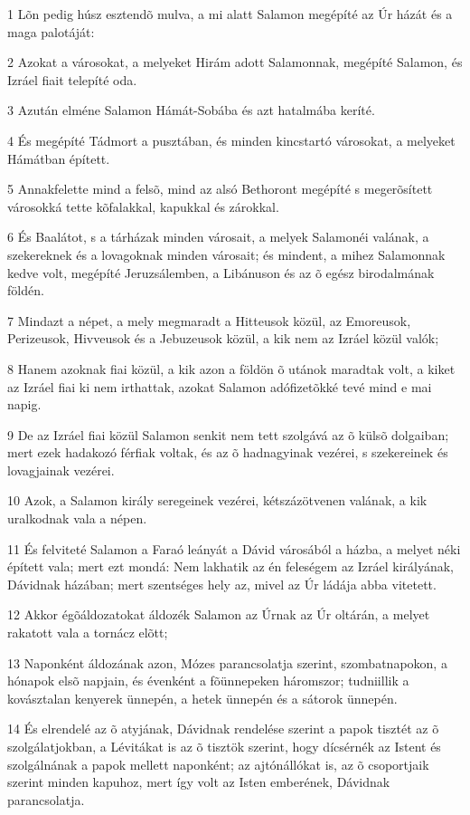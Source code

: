 \par 1 Lõn pedig húsz esztendõ mulva, a mi alatt Salamon megépíté az Úr házát és a maga palotáját:
\par 2 Azokat a városokat, a melyeket Hirám adott Salamonnak, megépíté Salamon, és Izráel fiait telepíté oda.
\par 3 Azután elméne Salamon Hámát-Sobába és azt hatalmába keríté.
\par 4 És megépíté Tádmort a pusztában, és minden kincstartó városokat, a melyeket Hámátban épített.
\par 5 Annakfelette mind a felsõ, mind az alsó Bethoront megépíté s megerõsített városokká tette kõfalakkal, kapukkal és zárokkal.
\par 6 És Baalátot, s a tárházak minden városait, a melyek Salamonéi valának, a szekereknek és a lovagoknak minden városait; és mindent, a mihez Salamonnak kedve volt, megépíté Jeruzsálemben, a Libánuson  és az õ egész birodalmának földén.
\par 7 Mindazt a népet, a mely megmaradt a Hitteusok közül, az Emoreusok, Perizeusok, Hivveusok és a Jebuzeusok közül, a kik nem az Izráel közül valók;
\par 8 Hanem azoknak fiai közül, a kik azon a földön õ utánok maradtak volt, a kiket az Izráel fiai ki nem irthattak, azokat Salamon adófizetõkké tevé mind e mai napig.
\par 9 De az Izráel fiai közül Salamon senkit nem tett szolgává az õ külsõ dolgaiban; mert ezek hadakozó férfiak voltak, és az õ hadnagyinak vezérei, s szekereinek és lovagjainak vezérei.
\par 10 Azok, a Salamon király seregeinek vezérei, kétszázötvenen valának, a kik uralkodnak vala a népen.
\par 11 És felviteté Salamon a Faraó leányát a Dávid városából a házba, a melyet néki épített vala; mert ezt mondá: Nem lakhatik az én feleségem az Izráel királyának, Dávidnak házában; mert szentséges hely az, mivel az Úr ládája abba  vitetett.
\par 12 Akkor égõáldozatokat áldozék Salamon az Úrnak az Úr oltárán, a melyet rakatott vala a tornácz elõtt;
\par 13 Naponként áldozának azon, Mózes parancsolatja szerint, szombatnapokon, a hónapok elsõ napjain, és évenként a fõünnepeken  háromszor; tudniillik a kovásztalan kenyerek ünnepén, a hetek ünnepén és a sátorok ünnepén.
\par 14 És elrendelé az õ atyjának, Dávidnak rendelése szerint a papok tisztét az õ szolgálatjokban, a Lévitákat is az õ tisztök szerint, hogy dícsérnék az Istent és szolgálnának a papok mellett naponként; az ajtónállókat is, az õ csoportjaik szerint minden kapuhoz, mert így volt az Isten emberének, Dávidnak parancsolatja.
